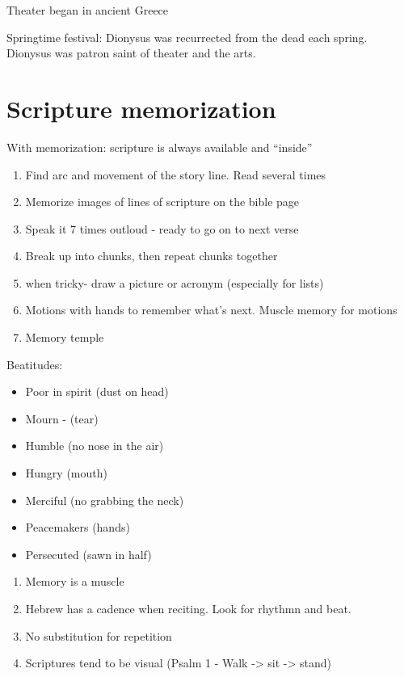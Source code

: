 \documentclass[
]{book}
\providecommand{\tightlist}{%
  \setlength{\itemsep}{0pt}\setlength{\parskip}{0pt}}
\begin{document}
Theater began in ancient Greece

Springtime festival: Dionysus was recurrected from the dead each spring. Dionysus was patron saint of theater and the arts.

\hypertarget{section}{%
\subsubsection{}\label{section}}

\hypertarget{scripture-memorization}{%
\chapter{Scripture memorization}\label{scripture-memorization}}

With memorization: scripture is always available and ``inside''

\begin{enumerate}
\def\labelenumi{\arabic{enumi})}
\item
  Find arc and movement of the story line. Read several times
\item
  Memorize images of lines of scripture on the bible page
\item
  Speak it 7 times outloud - ready to go on to next verse
\item
  Break up into chunks, then repeat chunks together
\item
  when tricky- draw a picture or acronym (especially for lists)
\item
  Motions with hands to remember what's next. Muscle memory for motions
\item
  Memory temple
\end{enumerate}

Beatitudes:

\begin{itemize}
\tightlist
\item
  Poor in spirit (dust on head)
\item
  Mourn - (tear)
\item
  Humble (no nose in the air)
\item
  Hungry (mouth)
\item
  Merciful (no grabbing the neck)
\item
  Peacemakers (hands)
\item
  Persecuted (sawn in half)
\end{itemize}

\begin{enumerate}
\def\labelenumi{\arabic{enumi})}
\setcounter{enumi}{7}
\item
  Memory is a muscle
\item
  Hebrew has a cadence when reciting. Look for rhythmn and beat.
\item
  No substitution for repetition
\item
  Scriptures tend to be visual (Psalm 1 - Walk -\textgreater{} sit -\textgreater{} stand)
\end{enumerate}
\end{document}
